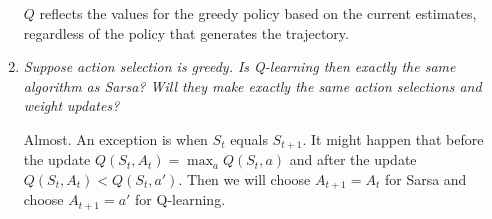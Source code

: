\documentclass[12pt,a4paper]{article}
\begin{document}
\begin{enumerate}
$Q$ reflects the values for the greedy policy based on the current estimates, regardless of the
policy that generates the trajectory.

\item
\textit{Suppose action selection is greedy. Is Q-learning then exactly the same
algorithm as Sarsa? Will they make exactly the same action selections and weight
updates?}

Almost. An exception is when $S_t$ equals $S_{t + 1}$. It might happen
that before the update $Q(S_t, A_t) = \max_aQ(S_t, a)$ and
after the update $Q(S_t, A_t) < Q(S_t, a')$. Then we will choose $A_{t + 1} = A_t$ for
Sarsa and choose $A_{t + 1} = a'$ for Q-learning.

\end{enumerate}
\end{document}
